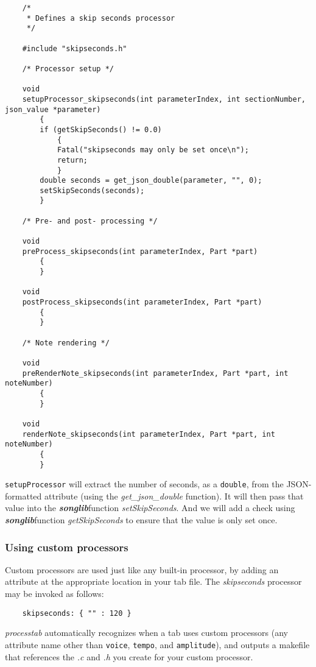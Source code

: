 \documentclass{article}
\newcommand\songlib {{\it\bf songlib}}
\begin{document}
\begin{verbatim}
	/*
	 * Defines a skip seconds processor
	 */

	#include "skipseconds.h"

	/* Processor setup */

	void
	setupProcessor_skipseconds(int parameterIndex, int sectionNumber, json_value *parameter)
		{
		if (getSkipSeconds() != 0.0)
			{
			Fatal("skipseconds may only be set once\n");
			return;
			}
		double seconds = get_json_double(parameter, "", 0);
		setSkipSeconds(seconds);
		}

	/* Pre- and post- processing */

	void
	preProcess_skipseconds(int parameterIndex, Part *part)
		{
		}

	void
	postProcess_skipseconds(int parameterIndex, Part *part)
		{
		}
	 
	/* Note rendering */
		
	void
	preRenderNote_skipseconds(int parameterIndex, Part *part, int noteNumber)
		{
		}
		
	void
	renderNote_skipseconds(int parameterIndex, Part *part, int noteNumber)
		{
		}
\end{verbatim}

\verb!setupProcessor! will extract the number of seconds, as a \verb!double!,
from the JSON-formatted attribute (using the {\it get\_json\_double} function).
It will then pass that value into the \songlib function {\it setSkipSeconds}.
And we will add a check using \songlib function {\it getSkipSeconds} to ensure
that the value is only set once.

\subsubsection*{Using custom processors}

Custom processors are used just like any built-in processor, by adding an
attribute at the appropriate location in your tab file.  The {\it skipseconds}
processor may be invoked as follows:

\begin{verbatim}
	skipseconds: { "" : 120 }
\end{verbatim}

{\it processtab} automatically recognizes when a tab uses custom processors (any
attribute name other than \verb!voice!, \verb!tempo!, and \verb!amplitude!), and
outputs a makefile that references the {\it .c} and {\it .h} you create for your
custom processor.
\end{document}
